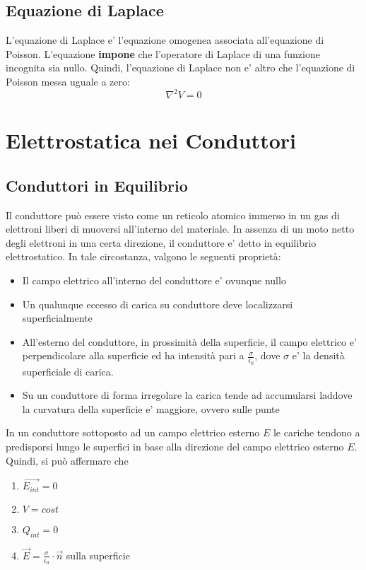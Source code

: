 \documentclass[a4paper, 10pt]{article}
\begin{document}
		\subsection{Equazione di Laplace}
		L'equazione di Laplace e' l'equazione omogenea associata all'equazione di Poisson. 
		L'equazione \textbf{impone} che l'operatore di Laplace di una funzione incognita sia nullo. Quindi, 
		l'equazione di Laplace non e' altro che l'equazione di Poisson messa uguale a zero:
		\[ \nabla ^2 V = 0\]
		
	\newpage
	\section{Elettrostatica nei Conduttori}
		\subsection{Conduttori in Equilibrio}
			Il conduttore può essere visto come un reticolo atomico immerso in un gas di elettroni liberi di muoversi
            all'interno del materiale. In assenza di un moto netto degli elettroni in una certa direzione, il conduttore 
			e' detto in equilibrio elettrostatico. In tale circostanza, valgono le seguenti proprietà:
			\begin{itemize}
				\item Il campo elettrico all'interno del conduttore e' ovunque nullo
				\item Un qualunque eccesso di carica su conduttore deve localizzarsi superficialmente
				\item All'esterno del conduttore, in prossimità della superficie, il campo elettrico e' perpendicolare alla
					  superficie ed ha intensità pari a $\frac{\sigma}{\epsilon_0}$, dove $\sigma$ e' la densità 
				 	  superficiale di carica.
				\item Su un conduttore di forma irregolare la carica tende ad accumularsi laddove la 
					  curvatura della superficie e' maggiore, ovvero sulle punte
			\end{itemize}
			In un conduttore sottoposto ad un campo elettrico esterno $E$ le cariche tendono a predisporsi 
			lungo le superfici in base alla direzione del campo elettrico esterno $E$.
			Quindi, si può affermare che 
			\begin{enumerate}
				\item $\overrightarrow{E_{int}} = 0$
				\item $ V = cost$ 
				\item $Q_{int} = 0$
				\item $\overrightarrow{E} = \frac{\sigma}{\epsilon_0} \cdot \overrightarrow{n}$ sulla superficie
			\end{enumerate}	
\end{document}
